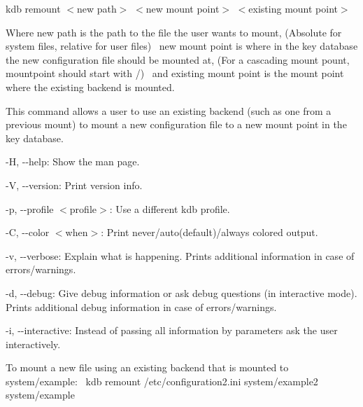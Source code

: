 {\ttfamily kdb remount $<$new path$>$ $<$new mount point$>$ $<$existing mount point$>$}

Where {\ttfamily new path} is the path to the file the user wants to mount, (Absolute for system files, relative for user files)~\newline
 {\ttfamily new mount point} is where in the key database the new configuration file should be mounted at, (For a cascading mount pount, {\ttfamily mountpoint} should start with {\ttfamily /})~\newline
 and {\ttfamily existing mount point} is the mount point where the existing backend is mounted.~\newline


This command allows a user to use an existing backend (such as one from a previous mount) to mount a new configuration file to a new mount point in the key database.~\newline



\begin{DoxyItemize}
\item {\ttfamily -\/H}, {\ttfamily -\/-\/help}\+: Show the man page.
\item {\ttfamily -\/V}, {\ttfamily -\/-\/version}\+: Print version info.
\item {\ttfamily -\/p}, {\ttfamily -\/-\/profile $<$profile$>$}\+: Use a different kdb profile.
\item {\ttfamily -\/C}, {\ttfamily -\/-\/color $<$when$>$}\+: Print never/auto(default)/always colored output.
\item {\ttfamily -\/v}, {\ttfamily -\/-\/verbose}\+: Explain what is happening. Prints additional information in case of errors/warnings.
\item {\ttfamily -\/d}, {\ttfamily -\/-\/debug}\+: Give debug information or ask debug questions (in interactive mode). Prints additional debug information in case of errors/warnings.
\item {\ttfamily -\/i}, {\ttfamily -\/-\/interactive}\+: Instead of passing all information by parameters ask the user interactively.
\end{DoxyItemize}

To mount a new file using an existing backend that is mounted to {\ttfamily system/example}\+:~\newline
 {\ttfamily kdb remount /etc/configuration2.ini system/example2 system/example}~\newline
 